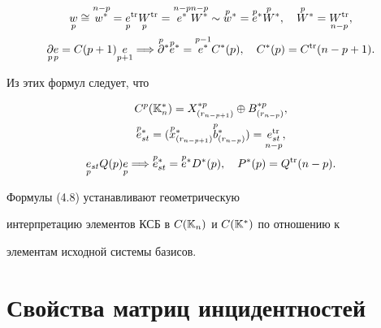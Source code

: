 \begin{note}
\begin{gather*}
\down{p}{w}\cong\up{n-p}{w^*}=\down{p}{e}^{\tr}\down{p}{W}^{\tr} 


=\up{n-p}{e^*}\up{n-p}{W^*}\sim 


\up{p}{w}^*=\up{p}{e}^*\up{p}{W}^*,\quad\up{p}{W}^*=\down{n-p}{W^{\tr}},\\ 


\down{p}{\partial}\down{p}{e}=C(p+1)\down{p+1}{e}\Longrightarrow 


\up{p}{\partial}^*\up{p}{e}^* 


=\up{p-1}{e^*}C^*(p),\quad 


C^*(p)=C^{\tr}(n-p+1). 


\end{gather*} 


Из этих формул следует, что 


\begin{gather*} 


C^p(\Bbb K_n^*)=X^{*p}_{(r_{n-p+1})}\oplus 


B^{*p}_{(r_{n-p})},\\ 


\up{p}{e}^*_{st}=(\up{p}{x}^*_{(r_{n-p+1})} 


\up{p}{b}^*_{(r_{n-p})})=\down{n-p}{e^{\tr}_{st}},\\ 


\down{p}{e}_{st}Q(p)\down{p}{e}\Longrightarrow 


\up{p}{e}^*_{st}=\up{p}{e}^*D^*(p),\quad 


P^*(p)=Q^{\tr}(n-p). 


\end{gather*} 


\end{note}


 


\begin{note} Формулы (4.8) устанавливают геометрическую 


интерпретацию элементов КСБ в $C(\Bbb K_n)$ и $C(\Bbb K^*)$ по отношению к 


элементам исходной системы базисов.


\end{note} 


 


\section{Свойства матриц инцидентностей} 


